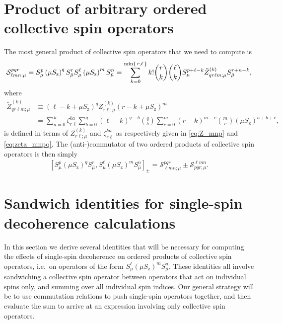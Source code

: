 \documentclass[pra,twocolumn,longbibliography]{revtex4-2}
\newcommand{\p}[1]{\left( #1 \right)} %
\renewcommand{\sp}[1]{\left[ #1 \right]} %
\renewcommand{\S}{\mathcal{S}}
\newcommand{\z}{\text{z}}
\newcommand{\bmu}{{\bar\mu}}
\newcommand{\1}{\mathds{1}}
\begin{document}
\section{Product of arbitrary ordered collective spin operators}
\label{sec:general_product}

The most general product of collective spin operators that we need to
compute is
\begin{align}
  \S^{pqr}_{\ell mn;\mu}
  = S_\mu^p \p{\mu S_\z}^q S_\bmu^r
  S_\mu^\ell \p{\mu S_\z}^m S_\bmu^n
  = \sum_{k=0}^{\min\set{r,\ell}} k! { r \choose k } { \ell \choose k }
  S_\mu^{p+\ell-k} \tilde Z_{qr\ell m;\mu}^{(k)} S_\bmu^{r+n-k},
  \label{eq:general_product}
\end{align}
where
\begin{align}
  \tilde Z_{qr\ell m;\mu}^{(k)}
  &\equiv \p{\ell-k+\mu S_\z}^q
  Z_{r\ell;\mu}^{(k)} \p{r-k+\mu S_\z}^m \\
  &= \sum_{a=0}^k \zeta_{r\ell}^{ka}
  \sum_{b=0}^q \p{\ell-k}^{q-b} { q \choose b }
  \sum_{c=0}^m \p{r-k}^{m-c} { m \choose c }
  \p{\mu S_\z}^{a+b+c},
\end{align}
is defined in terms of $Z_{r\ell;\mu}^{(k)}$ and $\zeta_{r\ell}^{ka}$
as respectively given in \eqref{eq:Z_mnp} and \eqref{eq:zeta_mnpq}.
The (anti-)commutator of two ordered products of collective spin
operators is then simply
\begin{align}
  \sp{S_\mu^p \p{\mu S_\z}^q S_\bmu^r,
    S_\mu^\ell \p{\mu S_\z}^m S_\bmu^n}_\pm
  = \S^{pqr}_{\ell mn;\mu} \pm \S^{\ell mn}_{pqr;\mu}.
\end{align}


\section{Sandwich identities for single-spin decoherence calculations}
\label{sec:sandwich_single}

In this section we derive several identities that will be necessary
for computing the effects of single-spin decoherence on ordered
products of collective spin operators, i.e.~on operators of the form
$S_\mu^\ell \p{\mu S_\z}^m S_\bmu^n$.  These identities all involve
sandwiching a collective spin operator between operators that act on
individual spins only, and summing over all individual spin indices.
Our general strategy will be to use commutation relations to push
single-spin operators together, and then evaluate the sum to arrive at
an expression involving only collective spin operators.
\end{document}
